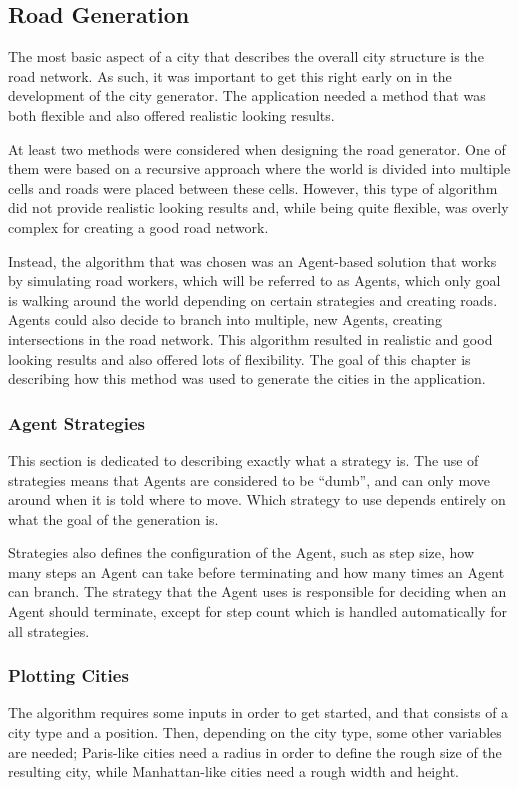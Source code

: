\subsection{Road Generation}
The most basic aspect of a city that describes the overall city structure is the
road network. As such, it was important to get this right early on in the
development of the city generator. The application needed a method that was both
flexible and also offered realistic looking results.

At least two methods were considered when designing the road generator. One of
them were based on a recursive approach where the world is divided into multiple
cells and roads were placed between these cells. However, this type of algorithm
did not provide realistic looking results and, while being quite flexible, was
overly complex for creating a good road network.

Instead, the algorithm that was chosen was an Agent-based solution that works by
simulating road workers, which will be referred to as Agents, which only goal is
walking around the world depending on certain strategies and creating roads.
Agents could also decide to branch into multiple, new Agents, creating
intersections in the road network.
This algorithm resulted in realistic and good looking results and also offered
lots of flexibility. The goal of this chapter is describing how this method was
used to generate the cities in the application.

\subsubsection{Agent Strategies}
This section is dedicated to describing exactly what a strategy is. The use of
strategies means that Agents are considered to be ``dumb'', and can only move
around when it is told where to move. Which strategy to use depends entirely on
what the goal of the generation is.

Strategies also defines the configuration of the Agent, such as step size, how
many steps an Agent can take before terminating and how many times an Agent can
branch. The strategy that the Agent uses is responsible for deciding when an
Agent should terminate, except for step count which is handled automatically for
all strategies.

\subsubsection{Plotting Cities}
The algorithm requires some inputs in order to get started, and that consists of
a city type and a position. Then, depending on the city type, some other
variables are needed; Paris-like cities need a radius in order to define the
rough size of the resulting city, while Manhattan-like cities need a rough width
and height.

